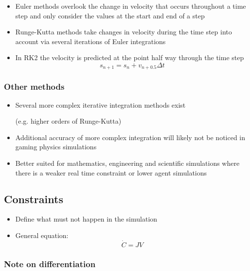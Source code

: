 \documentclass[a4paper]{article}
\begin{document}
\begin{itemize}
  \item
    Euler methods overlook the change in velocity that occurs throughout a time
    step and only consider the values at the start and end of a step

  \item
    Runge-Kutta methods take changes in velocity during the time step into
    account via several iterations of Euler integrations

  \item
    In RK2 the velocity is predicted at the point half way through the time step
    \[
      s_{n + 1} = s_{n} + v_{n + 0.5} \Delta t
    \]

\end{itemize}

\subsubsection{Other methods}

\begin{itemize}
  \item
    Several more complex iterative integration methods exist

    (e.g. higher orders of Runge-Kutta)

  \item
    Additional accuracy of more complex integration will likely not be noticed
    in gaming physics simulations

  \item
    Better suited for mathematics, engineering and scientific simulations where
    there is a weaker real time constraint or lower agent simulations

\end{itemize}

\subsection{Constraints}

\begin{itemize}
  \item
    Define what must not happen in the simulation

  \item
    General equation:
    \[
      \dot C = JV
    \]

\end{itemize}

\subsubsection{Note on differentiation}
\end{document}
